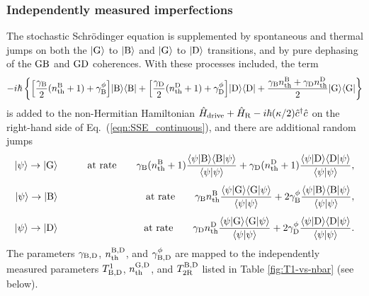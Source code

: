 \documentclass[
						superscriptaddress, 																 amsmath, amssymb,
		 aps,  prb,  
										floatfix,
		linenumbers,
			]{revtex4-1}
\begin{document}
\subsubsection{Independently measured imperfections}
The stochastic Schr\"odinger equation is supplemented by spontaneous and thermal jumps on both the $|{\rm G}\rangle$ to $|{\rm B}\rangle$ and $|{\rm G}\rangle$ to $|{\rm D}\rangle$ transitions, and by pure dephasing of the ${\rm GB}$ and ${\rm GD}$ coherences. With these processes included, the term
\begin{equation}
-i\hbar\left\{\left[\frac{\gamma_{\rm B}}2(n_{\rm th}^{\rm B}+1)+\gamma_{\rm B}^\phi\right]\mkern-3mu|{\rm B}\rangle\langle{\rm B}|+\left[\frac{\gamma_{\rm D}}2(n_{\rm th}^{\rm D}+1)+\gamma_{\rm D}^\phi\right]\mkern-3mu|{\rm D}\rangle\langle{\rm D}|+\frac{\gamma_{\rm B}n_{\rm th}^{\rm B}+\gamma_{\rm D}n_{\rm th}^{\rm D}}2|{\rm G}\rangle\langle{\rm G}|\right\}\nonumber
\end{equation}
is added to the non-Hermitian Hamiltonian $\hat H_{\rm drive}+\hat H_{\rm R}-i\hbar(\kappa/2)\hat c^\dagger\hat c$ on the right-hand side of Eq.~(\ref{eqn:SSE_continuous}), and there are additional random jumps
\begin{eqnarray}
|\psi\rangle\to|{\rm G}\rangle&&\qquad\hbox{at rate}\qquad\gamma_{\rm B}(n_{\rm th}^{\rm B}+1)\frac{\langle\psi|{\rm B}\rangle\langle{\rm B}|\psi\rangle}{\langle\psi|\psi\rangle}+\gamma_{\rm D}(n_{\rm th}^{\rm D}+1)\frac{\langle\psi|{\rm D}\rangle\langle{\rm D}|\psi\rangle}{\langle\psi|\psi\rangle},\\
\noalign{\vskip4pt}
|\psi\rangle\to|{\rm B}\rangle&&\qquad\hbox{at rate}\qquad\gamma_{\rm B}n_{\rm th}^{\rm B}\frac{\langle\psi|{\rm G}\rangle\langle{\rm G}|\psi\rangle}{\langle\psi|\psi\rangle}+2\gamma_{\rm B}^{\phi}\frac{\langle\psi|{\rm B}\rangle\langle{\rm B}|\psi\rangle}{\langle\psi|\psi\rangle},\\
\noalign{\vskip4pt}
|\psi\rangle\to|{\rm D}\rangle&&\qquad\hbox{at rate}\qquad\gamma_{\rm D}n_{\rm th}^{\rm D}\frac{\langle\psi|{\rm G}\rangle\langle{\rm G}|\psi\rangle}{\langle\psi|\psi\rangle}+2\gamma_{\rm D}^{\phi}\frac{\langle\psi|{\rm D}\rangle\langle{\rm D}|\psi\rangle}{\langle\psi|\psi\rangle}.
\end{eqnarray}
The parameters $\gamma_{\rm B,D}$, $n_{\rm th}^{\rm B,D}$, and $\gamma_{\rm B,D}^\phi$ are mapped to the independently measured parameters $T_{\rm B,D}^1$, $n_{\rm th}^{\rm G,D}$, and $T_{2{\rm R}}^{\rm B,D}$ listed in Table \ref{fig:T1-vs-nbar} (see below).
\end{document}
